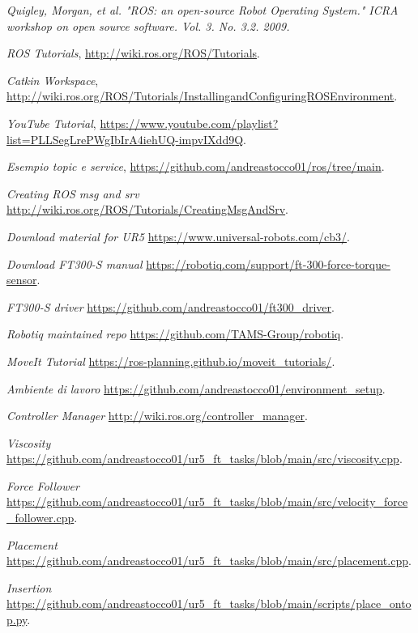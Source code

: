 \begin{thebibliography}{99}

 \textit{Quigley, Morgan, et al. "ROS: an open-source Robot Operating System." ICRA workshop on open source software. 
Vol. 3. No. 3.2. 2009.}

 \textit{ROS Tutorials}, \url{http://wiki.ros.org/ROS/Tutorials}.

 \textit{Catkin Workspace}, \url{http://wiki.ros.org/ROS/Tutorials/InstallingandConfiguringROSEnvironment}.

 \textit{YouTube Tutorial}, \url{https://www.youtube.com/playlist?list=PLLSegLrePWgIbIrA4iehUQ-impvIXdd9Q}.

 \textit{Esempio topic e service}, \url{https://github.com/andreastocco01/ros/tree/main}.

 \textit{Creating ROS msg and srv} \url{http://wiki.ros.org/ROS/Tutorials/CreatingMsgAndSrv}.

 \textit{Download material for UR5} \url{https://www.universal-robots.com/cb3/}.

 \textit{Download FT300-S manual} \url{https://robotiq.com/support/ft-300-force-torque-sensor}.

 \textit{FT300-S driver} \url{https://github.com/andreastocco01/ft300_driver}.

 \textit{Robotiq maintained repo} \url{https://github.com/TAMS-Group/robotiq}.

 \textit{MoveIt Tutorial} \url{https://ros-planning.github.io/moveit_tutorials/}.

 \textit{Ambiente di lavoro} \url{https://github.com/andreastocco01/environment_setup}.

 \textit{Controller Manager} \url{http://wiki.ros.org/controller_manager}.

 \textit{Viscosity} \url{https://github.com/andreastocco01/ur5_ft_tasks/blob/main/src/viscosity.cpp}. 

 \textit{Force Follower} \url{https://github.com/andreastocco01/ur5_ft_tasks/blob/main/src/velocity_force_follower.cpp}.

 \textit{Placement} \url{https://github.com/andreastocco01/ur5_ft_tasks/blob/main/src/placement.cpp}.

 \textit{Insertion} \url{https://github.com/andreastocco01/ur5_ft_tasks/blob/main/scripts/place_ontop.py}.

\end{thebibliography}